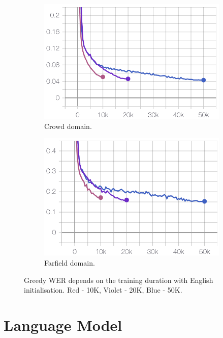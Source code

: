 \documentclass[a4paper]{article}
\begin{document}
\begin{figure}[ht]
\begin{subfigure}{.49\linewidth}
  \centering
  \includegraphics[width=1.\linewidth]{LaTeX/img/crowd_5.095_4.629_4.327_en.png}  
  \caption{Crowd domain.}
  \label{fig:wer_steps1}
\end{subfigure}
\begin{subfigure}{.49\linewidth}
  \centering
  \includegraphics[width=1.\linewidth]{LaTeX/img/portal_17.13_15.95_15.28_en.png}  
  \caption{Farfield domain.}
  \label{fig:wer_steps2}
\end{subfigure}
\caption{Greedy WER depends on the training duration with English initialisation. Red - 10K, Violet - 20K, Blue - 50K. }
\label{fig:wer_steps}
\end{figure}

\section{Language Model}
\end{document}
